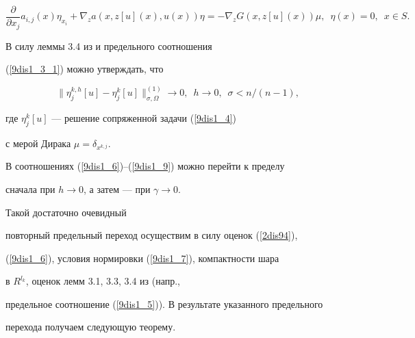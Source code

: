 \begin{equation}\label{9dis1_4}


\frac{\partial}{\partial


x_j}a_{i,j}(x)\eta_{x_i}+


\nabla_z a(x,z[u](x),u(x))\eta=


-\nabla_z G(x,z[u](x))\mu,\ \; \eta(x)=0,\ \; x\in S.


\end{equation}





В силу леммы 3.4 из \cite{sumin98} и предельного соотношения


(\ref{9dis1_3_1}) можно утверждать, что


\begin{equation}\label{9dis1_5}


\|\eta_j^{k,h}[u]-\eta_j^k[u]\|_{\sigma,\Omega}^{(1)}\to 0,\ \; h\to


0,\ \; \sigma<n/(n-1),


\end{equation}


где $\eta_j^k[u]$ --- решение сопряженной задачи (\ref{9dis1_4})


с мерой Дирака $\mu=\delta_{x^{k,j}}$.





В соотношениях (\ref{9dis1_6})--(\ref{9dis1_9}) можно перейти к пределу


сначала при $h\to 0$, а затем --- при $\gamma\to 0$.


Такой достаточно очевидный


повторный предельный переход осуществим в силу оценок (\ref{2dis94}),


(\ref{9dis1_6}), условия нормировки (\ref{9dis1_7}), компактности шара


в $R^{l_k}$, оценок лемм 3.1, 3.3, 3.4 из \cite{sumin98} (напр.,


предельное соотношение (\ref{9dis1_5})). В результате указанного предельного


перехода получаем следующую теорему.





